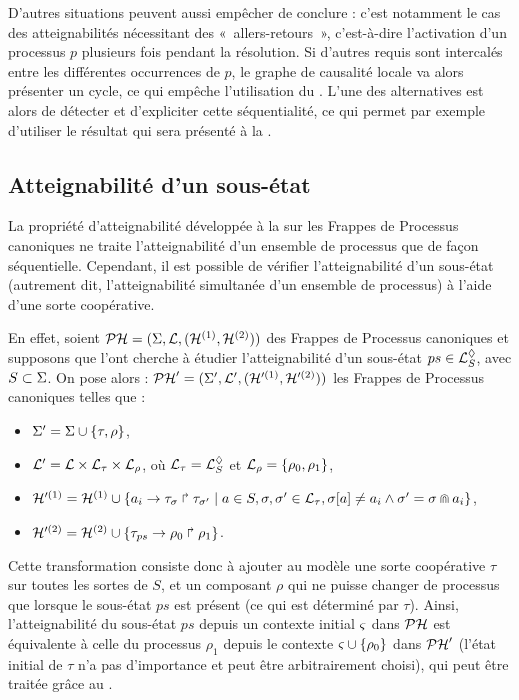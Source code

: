 D'autres situations peuvent aussi empêcher de conclure : c'est notamment le cas des
atteignabilités nécessitant des «~allers-retours~»,
c'est-à-dire l'activation d'un processus $p$ plusieurs fois pendant la résolution.
Si d'autres requis sont intercalés entre les différentes occurrences de $p$,
le graphe de causalité locale va alors présenter un cycle, ce qui empêche l'utilisation
du .
L'une des alternatives est alors de détecter et d'expliciter cette séquentialité,
ce qui permet par exemple d'utiliser le résultat qui sera présenté à la
.



\subsection{Atteignabilité d'un sous-état}

\newcommand{\uastotal}{\tau}
\newcommand{\uasreach}{\rho}
\newcommand{\uasps}{{ps}}

La propriété d'atteignabilité développée à la 
sur les Frappes de Processus canoniques
ne traite l'atteignabilité d'un ensemble de processus que de façon séquentielle.
Cependant, il est possible de vérifier l'atteignabilité d'un sous-état
(autrement dit, l'atteignabilité simultanée d'un ensemble de processus)
à l'aide d'une sorte coopérative.

En effet, soient $\mathcal{PH} = (\Sigma, \mathcal{L}, (\mathcal{H}^{(1)}, \mathcal{H}^{(2)}))$ des Frappes de Processus
canoniques et supposons que l'ont cherche à étudier l'atteignabilité d'un sous-état
$\uasps \in \PHsubl_S$, avec $S \subset \Sigma$.
On pose alors : $\mathcal{PH}' = (\Sigma', \mathcal{L}', (\mathcal{H}'^{(1)}, \mathcal{H}'^{(2)}))$
les Frappes de Processus canoniques telles que :
\begin{itemize}
  \item $\PHs' = \PHs \cup \{ \uastotal, \uasreach \}$,
  \item $\PHl' = \PHl \times \PHl_\uastotal \times \PHl_\uasreach$, où
    $\PHl_\uastotal = \PHsubl_S$ et $\PHl_\uasreach = \{ \uasreach_0, \uasreach_1 \}$,
  \item $\PHh'^{(1)} = \PHh^{(1)} \cup
    \{ \PHfrappe{a_i}{\uastotal_\mysigma}{\uastotal_{\mysigma'}} \mid
    a \in S, \mysigma, \mysigma' \in \PHl_\uastotal,
    \PHget{\mysigma}{a} \neq a_i \wedge \mysigma' = \mysigma \recouvre a_i \}$,
  \item $\PHh'^{(2)} = \PHh^{(2)} \cup
    \{ \PHfrappe{\uastotal_\uasps}{\uasreach_0}{\uasreach_1} \}$.
\end{itemize}
Cette transformation consiste donc à ajouter au modèle
une sorte coopérative $\uastotal$ sur toutes les sortes de $S$,
et un composant $\uasreach$ qui ne puisse changer de processus que lorsque le sous-état $\uasps$
est présent (ce qui est déterminé par $\uastotal$).
Ainsi, l'atteignabilité du sous-état $\uasps$ depuis un contexte initial $\varsigma$ dans $\mathcal{PH}$
est équivalente à celle du processus $\uasreach_1$ depuis le contexte
$\ctx \cup \{ \uasreach_0 \}$ dans $\mathcal{PH}'$
(l'état initial de $\uastotal$ n'a pas d'importance et peut être arbitrairement choisi),
qui peut être traitée grâce au .

